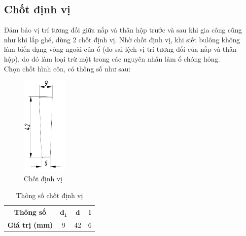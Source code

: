         \subsection{Chốt định vị}
            \hspace*{0.6cm}Đảm bảo vị trí tương đối giữa nắp và thân hộp trước và sau khi gia công cũng như khi lắp ghé, dùng 2 chốt định vị. Nhờ chốt định vị, khi siết bulông không làm biến dạng vòng ngoài của ổ (do sai lệch vị trí tương đối của nắp và thân hộp), do đó làm loại trừ một trong các nguyên nhân làm ổ chóng hỏng.\\
            \hspace*{0.6cm}Chọn chốt hình côn, có thông số như sau:
            \begin{figure}[H]
                \centering
                \includegraphics[width=0.2\textwidth]{pictures/position_pin.png}
                \caption{Chốt định vị}
                \label{position_pin}
            \end{figure}
            \begin{table}[H]
                \centering
                \begin{tabular}{|c|c|c|c|}
                    \hline
                    \textbf{Thông số} & $\mathbf{d_1}$ & $\mathbf{d}$ & $\mathbf{l}$ \\
                    \hline
                    \textbf{Giá trị (mm)} & 9 & 42 & 6 \\
                    \hline
                \end{tabular}     
                \caption{Thông số chốt định vị}           
            \end{table}
